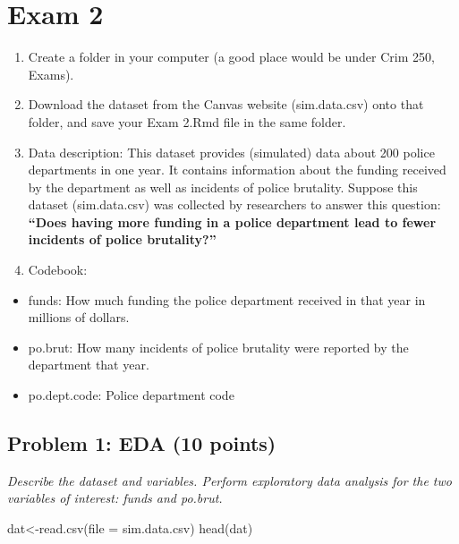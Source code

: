 \documentclass[
]{article}
\newenvironment{Shaded}{\begin{snugshade}}{\end{snugshade}}
\newcommand{\AttributeTok}[1]{\textcolor[rgb]{0.77,0.63,0.00}{#1}}
\newcommand{\FunctionTok}[1]{\textcolor[rgb]{0.00,0.00,0.00}{#1}}
\newcommand{\NormalTok}[1]{#1}
\newcommand{\OtherTok}[1]{\textcolor[rgb]{0.56,0.35,0.01}{#1}}
\newcommand{\StringTok}[1]{\textcolor[rgb]{0.31,0.60,0.02}{#1}}
\providecommand{\tightlist}{%
  \setlength{\itemsep}{0pt}\setlength{\parskip}{0pt}}
\begin{document}
\hypertarget{exam-2}{%
\section{Exam 2}\label{exam-2}}

\begin{enumerate}
\def\labelenumi{\alph{enumi}.}
\item
  Create a folder in your computer (a good place would be under Crim
  250, Exams).
\item
  Download the dataset from the Canvas website (sim.data.csv) onto that
  folder, and save your Exam 2.Rmd file in the same folder.
\item
  Data description: This dataset provides (simulated) data about 200
  police departments in one year. It contains information about the
  funding received by the department as well as incidents of police
  brutality. Suppose this dataset (sim.data.csv) was collected by
  researchers to answer this question: \textbf{``Does having more
  funding in a police department lead to fewer incidents of police
  brutality?''}
\item
  Codebook:
\end{enumerate}

\begin{itemize}
\tightlist
\item
  funds: How much funding the police department received in that year in
  millions of dollars.
\item
  po.brut: How many incidents of police brutality were reported by the
  department that year.
\item
  po.dept.code: Police department code
\end{itemize}

\hypertarget{problem-1-eda-10-points}{%
\subsection{Problem 1: EDA (10 points)}\label{problem-1-eda-10-points}}

\emph{Describe the dataset and variables. Perform exploratory data
analysis for the two variables of interest: funds and po.brut.}

\begin{Shaded}
\begin{Highlighting}[]
\NormalTok{dat}\OtherTok{\textless{}{-}}\FunctionTok{read.csv}\NormalTok{(}\AttributeTok{file =} \StringTok{\textquotesingle{}sim.data.csv\textquotesingle{}}\NormalTok{)}
\FunctionTok{head}\NormalTok{(dat)}
\end{Highlighting}
\end{Shaded}
\end{document}
